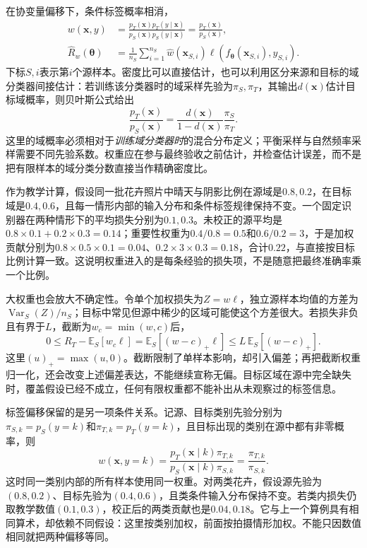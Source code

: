 在协变量偏移下，条件标签概率相消，
\begin{equation}
\begin{aligned}
w(\bm{x},y)
&=\frac{p_T(\bm{x})p_T(y\mid\bm{x})}
       {p_S(\bm{x})p_S(y\mid\bm{x})}
=\frac{p_T(\bm{x})}{p_S(\bm{x})},\\
\hat R_w(\bm{\theta})
&=\frac{1}{n_S}\sum_{i=1}^{n_S}
\hat w(\bm{x}_{S,i})\ell(f_{\bm{\theta}}(\bm{x}_{S,i}),y_{S,i}).
\end{aligned}
\label{eq:ket-update-covariate}
\end{equation}
下标$S,i$表示第$i$个源样本。密度比可以直接估计，也可以利用区分来源和目标的域分类器间接估计：若训练该分类器时的域采样先验为$\pi_S,\pi_T$，其输出$d(\bm{x})$估计目标域概率，则贝叶斯公式给出
\[
\frac{p_T(\bm{x})}{p_S(\bm{x})}
=\frac{d(\bm{x})}{1-d(\bm{x})}\frac{\pi_S}{\pi_T}.
\]
这里的域概率必须相对于\emph{训练域分类器时}的混合分布定义；平衡采样与自然频率采样需要不同先验系数。权重应在参与最终验收之前估计，并检查估计误差，而不是把有限样本的域分类分数直接当作精确密度比。

作为教学计算，假设同一批花卉照片中晴天与阴影比例在源域是$0.8,0.2$，在目标域是$0.4,0.6$，且每一情形内部的输入分布和条件标签规律保持不变。一个固定识别器在两种情形下的平均损失分别为$0.1,0.3$。未校正的源平均是$0.8\times0.1+0.2\times0.3=0.14$；重要性权重为$0.4/0.8=0.5$和$0.6/0.2=3$，于是加权贡献分别为$0.8\times0.5\times0.1=0.04$、$0.2\times3\times0.3=0.18$，合计$0.22$，与直接按目标比例计算一致。这说明权重进入的是每条经验的损失项，不是随意把最终准确率乘一个比例。

大权重也会放大不确定性。令单个加权损失为$Z=w\ell$，独立源样本均值的方差为$\operatorname{Var}_S(Z)/n_S$；目标中常见但源中稀少的区域可能使这个方差很大。若损失非负且有界于$L$，截断为$w_c=\min(w,c)$后，
\[
0\le R_T-\mathbb E_S[w_c\ell]
=\mathbb E_S[(w-c)_+\ell]
\le L\,\mathbb E_S[(w-c)_+].
\]
这里$(u)_+=\max(u,0)$。截断限制了单样本影响，却引入偏差；再把截断权重归一化，还会改变上述偏差表达，不能继续宣称无偏。目标区域在源中完全缺失时，覆盖假设已经不成立，任何有限权重都不能补出从未观察过的标签信息。

标签偏移保留的是另一项条件关系。记源、目标类别先验分别为$\pi_{S,k}=p_S(y=k)$和$\pi_{T,k}=p_T(y=k)$，且目标出现的类别在源中都有非零概率，则
\begin{equation}
w(\bm{x},y=k)
=\frac{p_T(\bm{x}\mid k)\pi_{T,k}}
       {p_S(\bm{x}\mid k)\pi_{S,k}}
=\frac{\pi_{T,k}}{\pi_{S,k}}.
\label{eq:ket-update-label-weight}
\end{equation}
这时同一类别内部的所有样本使用同一权重。对两类花卉，假设源先验为$(0.8,0.2)$、目标先验为$(0.4,0.6)$，且类条件输入分布保持不变。若类内损失仍取教学数值$(0.1,0.3)$，校正后的两类贡献也是$0.04,0.18$。它与上一个算例具有相同算术，却依赖不同假设：这里按类别加权，前面按拍摄情形加权。不能只因数值相同就把两种偏移等同。

